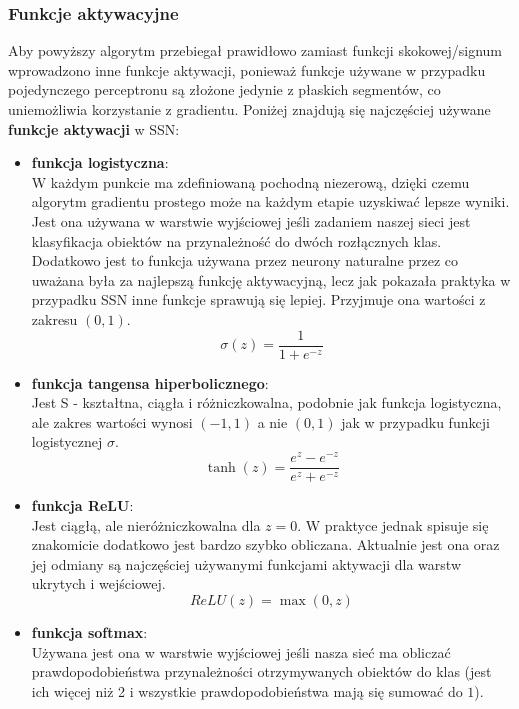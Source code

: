 \documentclass{article}
\begin{document}
\subsubsection{Funkcje aktywacyjne}
\label{sec:fa}
Aby powyższy algorytm przebiegał prawidłowo zamiast funkcji skokowej/signum wprowadzono inne 
funkcje aktywacji, ponieważ funkcje używane w przypadku pojedynczego perceptronu są złożone
jedynie z płaskich segmentów, co uniemożliwia korzystanie z gradientu. Poniżej znajdują się 
najczęściej używane \textbf{funkcje aktywacji} w SSN:
\begin{itemize}
\item \textbf{funkcja logistyczna}:\\
W każdym punkcie ma zdefiniowaną pochodną niezerową, dzięki czemu algorytm gradientu prostego
może na każdym etapie uzyskiwać lepsze wyniki. Jest ona używana w warstwie wyjściowej jeśli
zadaniem naszej sieci jest klasyfikacja obiektów na przynależność do dwóch rozłącznych klas.
Dodatkowo jest to funkcja używana przez neurony 
naturalne przez co uważana była za najlepszą funkcję aktywacyjną, lecz jak pokazała praktyka
w przypadku SSN inne funkcje sprawują się lepiej. Przyjmuje ona wartości z zakresu $(0,1)$.
\begin{equation}
\sigma(z) = \frac{1}{1 + e^{-z}}
\end{equation}
\item \textbf{funkcja tangensa hiperbolicznego}:\\
Jest S - kształtna, ciągła i różniczkowalna, podobnie jak funkcja logistyczna, 
ale zakres wartości wynosi $(-1, 1)$ a nie $(0, 1)$ jak w przypadku funkcji logistycznej
$\sigma$.
\begin{equation}
	\tanh(z) = \frac{e^z - e^{-z}}{e^z + e^{-z}}
\end{equation}
\item \textbf{funkcja ReLU}:\\
Jest ciągłą, ale nieróżniczkowalna dla $z = 0$. W praktyce jednak spisuje się znakomicie 
dodatkowo jest bardzo szybko obliczana. Aktualnie jest ona oraz jej odmiany są najczęściej
używanymi funkcjami aktywacji dla warstw ukrytych i wejściowej. 
\begin{equation}
	ReLU(z) = \max(0, z)
\end{equation}
\item \textbf{funkcja softmax}:\\
Używana jest ona w warstwie wyjściowej jeśli nasza sieć ma obliczać
prawdopodobieństwa przynależności otrzymywanych obiektów  do klas 
(jest ich więcej niż 2 i wszystkie prawdopodobieństwa mają się sumować do $1$).

\end{itemize}
\end{document}
